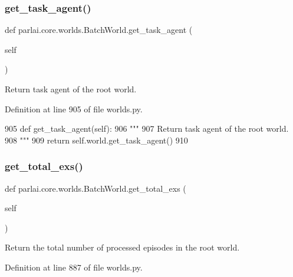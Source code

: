 \subsubsection{\texorpdfstring{get\+\_\+task\+\_\+agent()}{get\_task\_agent()}}
{\footnotesize\ttfamily def parlai.\+core.\+worlds.\+Batch\+World.\+get\+\_\+task\+\_\+agent (\begin{DoxyParamCaption}\item[{}]{self }\end{DoxyParamCaption})}

\begin{DoxyVerb}Return task agent of the root world.
\end{DoxyVerb}
 

Definition at line 905 of file worlds.\+py.


\begin{DoxyCode}
905     \textcolor{keyword}{def }get\_task\_agent(self):
906         \textcolor{stringliteral}{"""}
907 \textcolor{stringliteral}{        Return task agent of the root world.}
908 \textcolor{stringliteral}{        """}
909         \textcolor{keywordflow}{return} self.world.get\_task\_agent()
910 
\end{DoxyCode}
\mbox{\label{classparlai_1_1core_1_1worlds_1_1BatchWorld_ae9aec5868c6870316b6f1983a1e5e0ae}} 
\subsubsection{\texorpdfstring{get\+\_\+total\+\_\+exs()}{get\_total\_exs()}}
{\footnotesize\ttfamily def parlai.\+core.\+worlds.\+Batch\+World.\+get\+\_\+total\+\_\+exs (\begin{DoxyParamCaption}\item[{}]{self }\end{DoxyParamCaption})}

\begin{DoxyVerb}Return the total number of processed episodes in the root world.
\end{DoxyVerb}
 

Definition at line 887 of file worlds.\+py.


